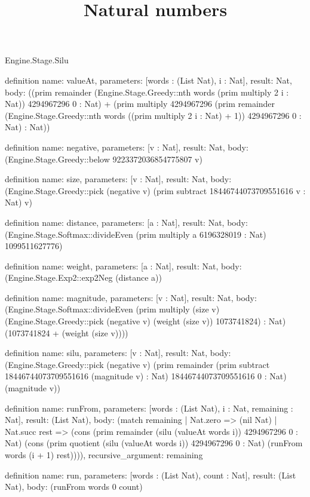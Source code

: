 \begin{lexlean}{Engine.Stage.Silu}
\title{Natural numbers}
\begin{semanticmodule}
definition{
  name: valueAt,
  parameters: [words : (List Nat), i : Nat],
  result: Nat,
  body: ((prim remainder (Engine.Stage.Greedy::nth words (prim multiply 2 i : Nat)) 4294967296 0 : Nat) + (prim multiply 4294967296 (prim remainder (Engine.Stage.Greedy::nth words ((prim multiply 2 i : Nat) + 1)) 4294967296 0 : Nat) : Nat))
}

definition{
  name: negative,
  parameters: [v : Nat],
  result: Nat,
  body: (Engine.Stage.Greedy::below 9223372036854775807 v)
}

definition{
  name: size,
  parameters: [v : Nat],
  result: Nat,
  body: (Engine.Stage.Greedy::pick (negative v) (prim subtract 18446744073709551616 v : Nat) v)
}

definition{
  name: distance,
  parameters: [a : Nat],
  result: Nat,
  body: (Engine.Stage.Softmax::divideEven (prim multiply a 6196328019 : Nat) 1099511627776)
}

definition{
  name: weight,
  parameters: [a : Nat],
  result: Nat,
  body: (Engine.Stage.Exp2::exp2Neg (distance a))
}

definition{
  name: magnitude,
  parameters: [v : Nat],
  result: Nat,
  body: (Engine.Stage.Softmax::divideEven (prim multiply (size v) (Engine.Stage.Greedy::pick (negative v) (weight (size v)) 1073741824) : Nat) (1073741824 + (weight (size v))))
}

definition{
  name: silu,
  parameters: [v : Nat],
  result: Nat,
  body: (Engine.Stage.Greedy::pick (negative v) (prim remainder (prim subtract 18446744073709551616 (magnitude v) : Nat) 18446744073709551616 0 : Nat) (magnitude v))
}

definition{
  name: runFrom,
  parameters: [words : (List Nat), i : Nat, remaining : Nat],
  result: (List Nat),
  body: (match remaining
    | Nat.zero => (nil Nat)
    | Nat.succ rest => (cons (prim remainder (silu (valueAt words i)) 4294967296 0 : Nat) (cons (prim quotient (silu (valueAt words i)) 4294967296 0 : Nat) (runFrom words (i + 1) rest)))),
  recursive_argument: remaining
}

definition{
  name: run,
  parameters: [words : (List Nat), count : Nat],
  result: (List Nat),
  body: (runFrom words 0 count)
}
\end{semanticmodule}
\end{lexlean}
